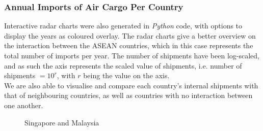 \documentclass{article}
\begin{document}
\newpage

\subsubsection{Annual Imports of Air Cargo Per Country}

Interactive radar charts were also generated in \textit{Python} code, with options to display the years as coloured overlay. The radar charts give a better overview on the interaction between the ASEAN countries, which in this case represents the total number of imports per year. The number of shipments have been log-scaled, and as such the axis represents the scaled value of shipments, i.e. number of shipments $= 10^r$, with $r$ being the value on the axis. \\

\noindent We are also able to visualise and compare each country's internal shipments with that of neighbouring countries, as well as countries with no interaction between one another. 

\begin{figure}[H]
    \centering
    \qquad
    \caption{Singapore and Malaysia}
    \label{fig: sm}
\end{figure}
\end{document}
